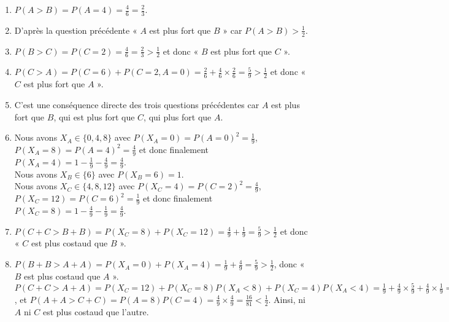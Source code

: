 \documentclass[a4paper,12pt,reqno]{amsart}
\begin{document}
\begin{solution}
  \begin{enumerate}
    \item $P(A > B) = P( A=4 ) = \frac{4}{6} = \frac{2}{3}$.
    \item D'après la question précédente « $A$ est plus fort que $B$ » car $P(A > B) > \frac{1}{2}.$
    \item $P(B > C) = P( C=2 ) = \frac{4}{6} = \frac{2}{3} > \frac{1}{2}$ et donc « $B$ est plus fort que $C$ ».
    \item $P(C > A) = P(C=6) + P(C=2,A=0) = \frac{2}{6} + \frac{4}{6} \times \frac{2}{6} = \frac{5}{9} > \frac{1}{2}$ et donc « $C$ est plus fort que $A$ ».
    \item C'est une conséquence directe des trois questions précédentes car $A$ est plus fort que $B$, qui est plus fort que $C$, qui plus fort que $A$.
    \item Nous avons $X_{A} \in \{0,4,8\}$ avec $P(X_{A}=0) = P(A=0)^{2} = \frac{1}{9}$, $P(X_{A}=8) = P(A=4)^{2} = \frac{4}{9}$ et donc finalement $P(X_{A}=4) = 1-\frac{1}{9}-\frac{4}{9} = \frac{4}{9}$.\\
    Nous avons $X_{B} \in \{6\}$ avec $P(X_{B}=6)=1$.\\
    Nous avons $X_{C} \in \{4,8,12\}$ avec $P(X_{C}=4) = P(C=2)^{2} = \frac{4}{9}$, $P(X_{C}=12) = P(C=6)^{2} = \frac{1}{9}$ et donc finalement $P(X_{C}=8) = 1-\frac{4}{9}-\frac{1}{9} = \frac{4}{9}$.
    \item $P(C+C > B+B) = P(X_{C}=8) + P(X_{C}=12) = \frac{4}{9} + \frac{1}{9} = \frac{5}{9} > \frac{1}{2}$ et donc « $C$ est plus costaud que $B$ ».
    \item $P(B+B > A+A) = P(X_{A}=0) + P(X_{A}=4) = \frac{1}{9} + \frac{4}{9} = \frac{5}{9} > \frac{1}{2}$, donc « $B$ est plus costaud que $A$ ».\\
    $P(C+C > A+A) = P(X_{C}=12) + P(X_{C}=8)P(X_{A} < 8) + P(X_{C}=4)P(X_{A} < 4) = \frac{1}{9} + \frac{4}{9}\times\frac{5}{9} + \frac{4}{9}\times\frac{1}{9} = \frac{34}{81} < \frac{1}{2}$, et $P(A+A > C+C) = P(A = 8)P(C=4) = \frac{4}{9}\times\frac{4}{9} = \frac{16}{81} < \frac{1}{2}$. Ainsi, ni $A$ ni $C$ est plus costaud que l'autre.
  \end{enumerate}

\end{solution}
\end{document}
